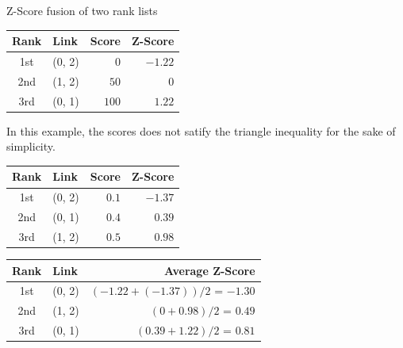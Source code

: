 \begin{example}
  \caption{Z-Score fusion of two rank lists}
  \label{ex:z_score_fusion}

  \begin{subexample}{\linewidth}
    \centering
    \begin{tabular}{c l r r}
      \toprule
      Rank & Link & Score & Z-Score \\
      \midrule
      1st & (0, 2) & $0$ & $-1.22$ \\
      2nd & (1, 2) & $50$ & $0$ \\
      3rd & (0, 1) & $100$ & $1.22$ \\
      \bottomrule
    \end{tabular}
  \end{subexample}

  \vspace{0.5cm}

  In this example, the scores does not satify the triangle inequality for the sake of simplicity.

  \vspace{0.5cm}

  \begin{subexample}{\linewidth}
    \centering
    \begin{tabular}{c l r r}
      \toprule
      Rank & Link & Score & Z-Score \\
      \midrule
      1st & (0, 2) & $0.1$ & $-1.37$ \\
      2nd & (0, 1) & $0.4$ & $0.39$ \\
      3rd & (1, 2) & $0.5$ & $0.98$ \\
      \bottomrule
    \end{tabular}
  \end{subexample}

  \vspace{0.5cm}

  \begin{subexample}{\linewidth}
    \centering
    \begin{tabular}{c l r}
      \toprule
      Rank & Link & Average Z-Score \\
      \midrule
      1st & (0, 2) & $(-1.22 + (-1.37)) / 2$ = $-1.30$ \\
      2nd & (1, 2) & $(0 + 0.98) / 2$ = $0.49$ \\
      3rd & (0, 1) & $(0.39 + 1.22) / 2$ = $0.81$ \\
      \bottomrule
    \end{tabular}
  \end{subexample}

\end{example}

